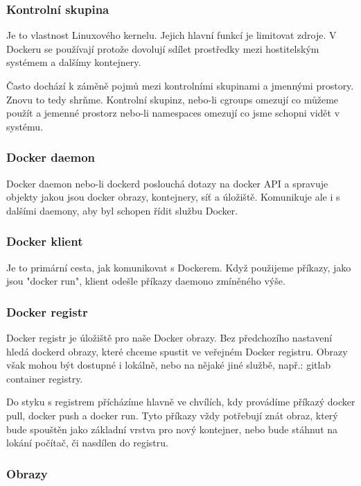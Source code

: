 \subsubsection{Kontrolní skupina}

Je to vlastnost Linuxového kernelu. Jejich hlavní funkcí je limitovat zdroje. V Dockeru se používají protože dovolují sdílet prostředky mezi hostitelským systémem a dalšímy kontejnery. 

Často dochází k záměně pojmů mezi kontrolními skupinami a jmennými prostory. Znovu to tedy shrňme. Kontrolní skupinz, nebo-li cgroups omezují co můžeme použít a jemenné prostorz nebo-li namespaces omezují co jsme schopni vidět v systému. 

\subsubsection{Docker daemon}

Docker daemon nebo-li dockerd poslouchá dotazy na docker API a spravuje objekty jakou jsou docker obrazy, kontejnery, síť a úložiště. Komunikuje ale i s dalšími daemony, aby byl schopen řídit službu Docker.

\subsubsection{Docker klient}

Je to primární cesta, jak komunikovat s Dockerem. Když použijeme příkazy, jako jsou "docker run", klient odešle příkazy daemono zmíněného výše. 

\subsubsection{Docker registr}

Docker registr je úložiště pro naše Docker obrazy. Bez předchozího nastavení hledá dockerd obrazy, které chceme spustit ve veřejném Docker registru. Obrazy však mohou být dostupné i lokálně, nebo na nějaké jiné službě, např.: gitlab container registry. 

Do styku s registrem přícházíme hlavně ve chvílích, kdy provádíme příkazý docker pull, docker push a docker run. Tyto příkazy vždy potřebují znát obraz, který bude spouštěn jako základní vrstva pro nový kontejner, nebo bude stáhnut na lokání počítač, či nasdílen do registru.

\subsubsection{Obrazy}


